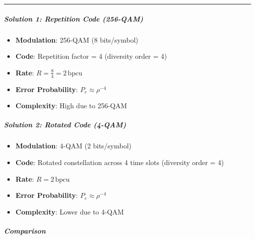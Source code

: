\documentclass[11pt]{article}
\providecommand{\tightlist}{%
      \setlength{\itemsep}{0pt}\setlength{\parskip}{0pt}}
\begin{document}
    \begin{center}\rule{0.5\linewidth}{0.5pt}\end{center}

\subparagraph{\texorpdfstring{\textbf{Solution 1: Repetition Code
(256-QAM)}}{Solution 1: Repetition Code (256-QAM)}}\label{solution-1-repetition-code-256-qam}

\begin{itemize}
\tightlist
\item
  \textbf{Modulation}: 256-QAM (8 bits/symbol)\\
\item
  \textbf{Code}: Repetition factor = 4 (diversity order = 4)\\
\item
  \textbf{Rate}: \(R = \frac{8}{4} = 2 \, \text{bpcu}\)\\
\item
  \textbf{Error Probability}: \(P_e \approx \rho^{-4}\)\\
\item
  \textbf{Complexity}: High due to 256-QAM
\end{itemize}

\subparagraph{\texorpdfstring{\textbf{Solution 2: Rotated Code
(4-QAM)}}{Solution 2: Rotated Code (4-QAM)}}\label{solution-2-rotated-code-4-qam}

\begin{itemize}
\tightlist
\item
  \textbf{Modulation}: 4-QAM (2 bits/symbol)\\
\item
  \textbf{Code}: Rotated constellation across 4 time slots (diversity
  order = 4)\\
\item
  \textbf{Rate}: \(R = 2 \, \text{bpcu}\)\\
\item
  \textbf{Error Probability}: \(P_e \approx \rho^{-4}\)\\
\item
  \textbf{Complexity}: Lower due to 4-QAM
\end{itemize}

\subparagraph{\texorpdfstring{\textbf{Comparison}}{Comparison}}\label{comparison}
\end{document}
